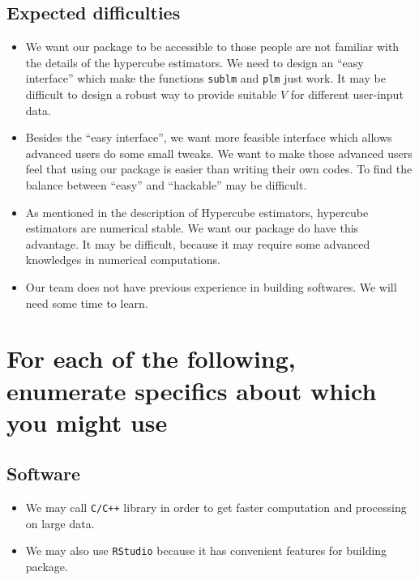 \documentclass[draft]{article}
\begin{document}
\subsection{Expected difficulties}
\begin{itemize}

	\item We want our package to be accessible to those people are not familiar with the details of the hypercube estimators. We need to design an ``easy interface'' which make the functions {\tt sublm} and {\tt plm} just work. It may be difficult to design a robust way to provide suitable $V$ for different user-input data.

	\item Besides the ``easy interface'', we want more feasible interface which allows advanced users do some small tweaks. We want to make those advanced users feel that using our package is easier than writing their own codes. To find the balance between ``easy'' and ``hackable'' may be difficult.

	\item As mentioned in the description of Hypercube estimators, hypercube estimators are numerical stable. We want our package do have this advantage. It may be difficult, because it may require some advanced knowledges in numerical computations.

	\item Our team does not have previous experience in building softwares. We will need some time to learn.

\end{itemize}


\section{For each of the following, enumerate specifics about which you might use}


\subsection{Software}
\begin{itemize}
	\item We may call {\tt C/C++} library in order to get faster computation and processing on large data.
	\item We may also use \texttt{RStudio} because it has convenient features for building package.
\end{itemize}
\end{document}
